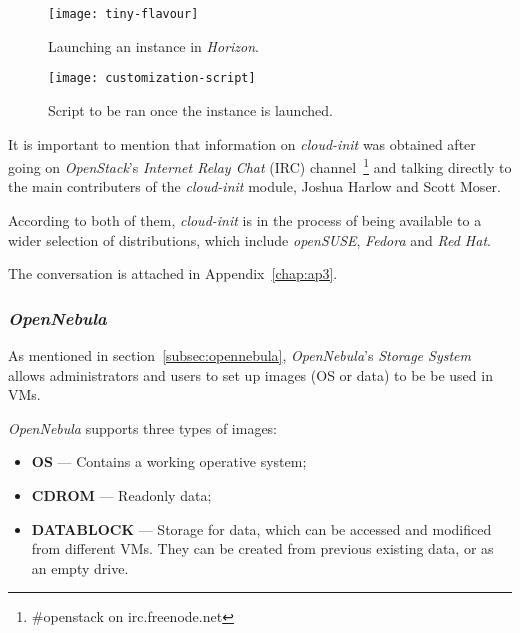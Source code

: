 \begin{figure}[h!]
  \begin{center}
    \leavevmode
    \texttt{[image: tiny-flavour]}
    \caption{Launching an instance in \textit{Horizon}.}
    \label{fig:tiny-flavour}
  \end{center} 
\end{figure}


\begin{figure}[h!]
  \begin{center}
    \leavevmode
    \texttt{[image: customization-script]}
    \caption{Script to be ran once the instance is launched.}
    \label{fig:customization-script}
  \end{center} 
\end{figure}


It is important to mention that information on \textit{cloud-init} was obtained after going on \textit{OpenStack}'s \textit{Internet Relay Chat} (IRC) channel~\footnote{\#openstack on irc.freenode.net} and talking directly to the main contributers of the \textit{cloud-init} module, Joshua Harlow and Scott Moser.

According to both of them, \textit{cloud-init} is in the process of being available to a wider selection of distributions, which include \textit{openSUSE}, \textit{Fedora} and \textit{Red Hat}. 

The conversation is attached in Appendix~\ref{chap:ap3}.
\clearpage
\subsubsection{\textit{OpenNebula}}

As mentioned in section~\ref{subsec:opennebula}, \textit{OpenNebula}'s \textit{Storage System} allows administrators and users to set up images (OS or data) to be be used in VMs. 

\textit{OpenNebula} supports three types of images:

\begin{itemize}
\item \textbf{OS} --- Contains a working operative system;
\item \textbf{CDROM} --- Readonly data;
\item \textbf{DATABLOCK} --- Storage for data, which can be accessed and modificed from different VMs. They can be created from previous existing data, or as an empty drive.
\end{itemize}

